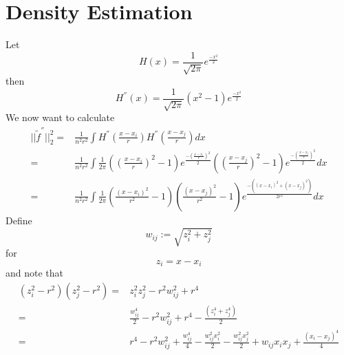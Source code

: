 \documentclass[12pt]{article}
\theoremstyle{my_thm}
\begin{document}
\section*{Density Estimation}
Let 
$$
H(x)=\frac{1}{\sqrt{2 \pi }}e^{\frac{-x^2}{2}}
$$
then
$$
H^{''}(x)=\frac{1}{\sqrt{2 \pi}} (x^2-1)e^{\frac{-x^2}{2}}
$$
We now want to calculate
\begin{align*}
||\tilde{f}^{''}||_2^2=&\frac{1}{n^2 r^2} \int H^{''}\left( \frac{x-x_i}{r}\right) H^{''}\left( \frac{x-x_j}{r}\right) dx 
\\
=&
\frac{1}{n^2 r^2} \int \frac{1}{2 \pi} \left( \left( \frac{x-x_i}{r}\right)^2-1\right)e^{\frac{-\left(\frac{x-x_i}{r}\right)^2}{2}}\left( \left( \frac{x-x_j}{r}\right)^2-1\right)e^{\frac{-\left(\frac{x-x_j}{r}\right)^2}{2}} dx
\\
=&
\frac{1}{n^2 r^2} \int \frac{1}{2 \pi} \left( \frac{(x-x_i)^2}{r^2}-1\right)\left( \frac{(x-x_j)^2}{r^2}-1\right)e^{\frac{-\left((x-x_i)^2+(x-x_j)^2\right)}{2r^2}} dx
\end{align*}
Define
$$
w_{ij}:=\sqrt{z_i^2+z_j^2}
$$
for 
$$
z_i=x-x_i
$$
and note that
\begin{align*}
\left( z_i^2-r^2\right)\left(z_j^2-r^2\right)
=&
z_i^2z_j^2-r^2w_{ij}^2+r^4
\\
=&
\frac{w_{ij}^4}{2} -r^2w_{ij}^2+r^4- \frac{(z_i^4+z_j^4)}{2}
\\
=&
r^4-r^2w_{ij}^2+ \frac{w_{ij}^4}{4}-\frac{w_{ij}^2x_i^2}{2}-\frac{w_{ij}^2x_j^2}{2}+w_{ij}x_ix_j+\frac{(x_i-x_j)^4}{4}
\end{align*}
\end{document}
